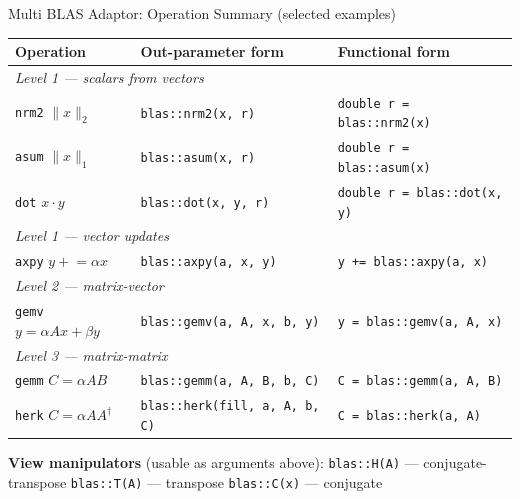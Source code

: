 \begin{frame}[label=blasops]{Multi BLAS Adaptor: Operation Summary (selected examples)}
\footnotesize
\setlength{\tabcolsep}{5pt}
\begin{tabular}{@{}lll@{}}
\hline
\textbf{Operation} & \textbf{Out-parameter form} & \textbf{Functional form} \\
\hline
\multicolumn{3}{l}{\textit{Level 1 --- scalars from vectors}} \\[2pt]
\texttt{nrm2} $\|x\|_2$  & \texttt{blas::nrm2(x, r)}        & \texttt{double r = blas::nrm2(x)} \\
\texttt{asum} $\|x\|_1$  & \texttt{blas::asum(x, r)}        & \texttt{double r = blas::asum(x)} \\
\texttt{dot}  $x \cdot y$ & \texttt{blas::dot(x, y, r)}     & \texttt{double r = blas::dot(x, y)} \\[4pt]
\multicolumn{3}{l}{\textit{Level 1 --- vector updates}} \\[2pt]
\texttt{axpy} $y \mathrel{+}= \alpha x$ & \texttt{blas::axpy(a, x, y)}    & \texttt{y += blas::axpy(a, x)} \\[4pt]
\multicolumn{3}{l}{\textit{Level 2 --- matrix-vector}} \\[2pt]
\texttt{gemv} $y = \alpha Ax + \beta y$          & \texttt{blas::gemv(a, A, x, b, y)} & \texttt{y = blas::gemv(a, A, x)} \\[4pt]
\multicolumn{3}{l}{\textit{Level 3 --- matrix-matrix}} \\[2pt]
\texttt{gemm} $C = \alpha AB$          & \texttt{blas::gemm(a, A, B, b, C)} & \texttt{C = blas::gemm(a, A, B)} \\
\texttt{herk} $C = \alpha A A^\dagger$ & \texttt{blas::herk(fill, a, A, b, C)} & \texttt{C = blas::herk(a, A)} \\
\hline
\end{tabular}

\medskip
{\footnotesize\textbf{View manipulators} (usable as arguments above):
\texttt{blas::H(A)} — conjugate-transpose \quad
\texttt{blas::T(A)} — transpose \quad
\texttt{blas::C(x)} — conjugate}
\end{frame}

